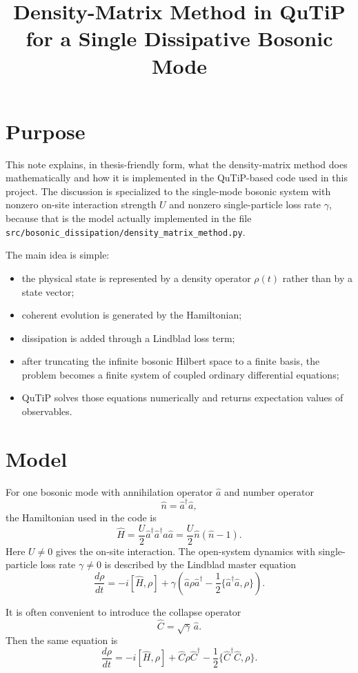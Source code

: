 \documentclass[12pt]{article}
\title{Density-Matrix Method in QuTiP for a Single Dissipative Bosonic Mode}
\author{}
\date{}
\begin{document}
\maketitle

\section*{Purpose}
This note explains, in thesis-friendly form, what the density-matrix method does mathematically and how it is implemented in the QuTiP-based code used in this project. The discussion is specialized to the single-mode bosonic system with nonzero on-site interaction strength $U$ and nonzero single-particle loss rate $\gamma$, because that is the model actually implemented in the file
\texttt{src/bosonic\_dissipation/density\_matrix\_method.py}.

The main idea is simple:
\begin{itemize}
\item the physical state is represented by a density operator $\rho(t)$ rather than by a state vector;
\item coherent evolution is generated by the Hamiltonian;
\item dissipation is added through a Lindblad loss term;
\item after truncating the infinite bosonic Hilbert space to a finite basis, the problem becomes a finite system of coupled ordinary differential equations;
\item QuTiP solves those equations numerically and returns expectation values of observables.
\end{itemize}

\section*{Model}
For one bosonic mode with annihilation operator $\hat a$ and number operator
\[
\hat n = \hat a^\dagger \hat a,
\]
the Hamiltonian used in the code is
\[
\hat H
= \frac{U}{2}\hat a^\dagger \hat a^\dagger \hat a \hat a
= \frac{U}{2}\hat n(\hat n-1).
\]
Here $U\neq 0$ gives the on-site interaction. The open-system dynamics with single-particle loss rate $\gamma \neq 0$ is described by the Lindblad master equation
\[
\frac{d\rho}{dt}
= -i[\hat H,\rho]
+ \gamma
\left(
\hat a \rho \hat a^\dagger
- \frac{1}{2}\{\hat a^\dagger \hat a,\rho\}
\right).
\]

It is often convenient to introduce the collapse operator
\[
\hat C = \sqrt{\gamma}\,\hat a.
\]
Then the same equation is
\[
\frac{d\rho}{dt}
= -i[\hat H,\rho]
+ \hat C \rho \hat C^\dagger
- \frac{1}{2}\{\hat C^\dagger \hat C,\rho\}.
\]
\end{document}
